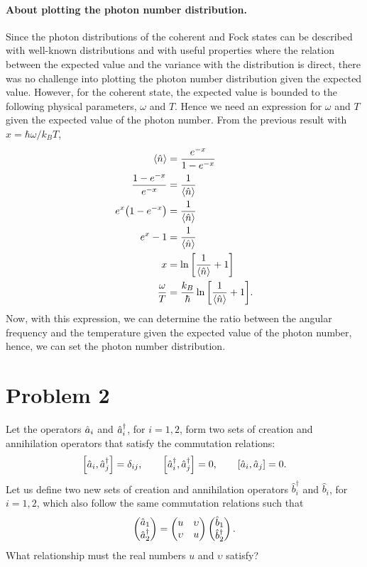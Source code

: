 \documentclass[../main.tex]{subfiles}
\begin{document}
\paragraph{About plotting the photon number distribution.}
Since the photon distributions of the coherent and Fock states can be described with well-known distributions and with useful properties where the relation between the expected value and the variance with the distribution is direct, there was no challenge into plotting the photon number distribution given the expected value.
However, for the coherent state, the expected value is bounded to the following physical parameters, $\omega$ and $T$.
Hence we need an expression for $\omega$ and $T$ given the expected value of the photon number.
From the previous result with $x=\hbar\omega/k_BT$,
\begin{align*}
    \expval{\hat{n}} &= \frac{e^{-x}}{1-e^{-x}} \\
    \frac{1-e^{-x}}{e^{-x}} &= \frac{1}{\expval{\hat{n}}} \\
    e^{x}\qty(1-e^{-x}) &= \frac{1}{\expval{\hat{n}}} \\
    e^{x}-1 &= \frac{1}{\expval{\hat{n}}} \\
    x &= \ln\qty[\frac{1}{\expval{\hat{n}}}+1] \\
    \frac{\omega}{T} &= \frac{k_B}{\hbar}\ln\qty[\frac{1}{\expval{\hat{n}}}+1].
\end{align*}
Now, with this expression, we can determine the ratio between the angular frequency and the temperature given the expected value of the photon number, hence, we can set the photon number distribution.



\section{Problem 2} Let the operators $\hat{a}_i$ and $\hat{a}^\dagger_i$, for $i=1,2$, form two sets of creation and annihilation operators that satisfy the commutation relations:
\begin{gather*}
   \commutator{\hata_i}{\hatad_j}=\delta_{ij},\qquad 
   \commutator{\hatad_i}{\hatad_j}=0,\qquad
   \commutator{\hata_i}{\hata_j}=0.
\end{gather*}
Let us define two new sets of creation and annihilation operators $\hat{b}^\dagger_i$ and $\hat{b}_i$, for $i=1,2$, which also follow the same commutation relations such that
\begin{gather*}
    \begin{pmatrix}
        \hat{a}_1 \\ \hat{a}^\dagger_2
    \end{pmatrix}
    =
    \begin{pmatrix}
        u & \upsilon \\ \upsilon & u
    \end{pmatrix}
    \begin{pmatrix}
        \hat{b}_1 \\ \hat{b}^\dagger_2
    \end{pmatrix}.
\end{gather*}
What relationship must the real numbers $u$ and $\upsilon$ satisfy?
\end{document}
